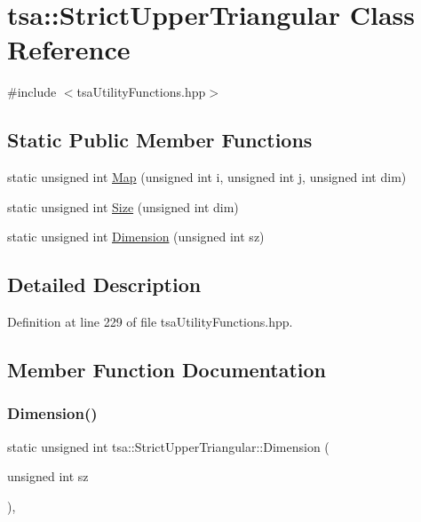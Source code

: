 \hypertarget{classtsa_1_1_strict_upper_triangular}{}\section{tsa\+:\+:Strict\+Upper\+Triangular Class Reference}
\label{classtsa_1_1_strict_upper_triangular}


{\ttfamily \#include $<$tsa\+Utility\+Functions.\+hpp$>$}

\subsection*{Static Public Member Functions}
\begin{DoxyCompactItemize}
\item 
static unsigned int \hyperlink{classtsa_1_1_strict_upper_triangular_a181559cdcde4660621e9c4d593cdb91b}{Map} (unsigned int i, unsigned int j, unsigned int dim)
\item 
static unsigned int \hyperlink{classtsa_1_1_strict_upper_triangular_a07caedb4fa38d3e286e392633c7c8d51}{Size} (unsigned int dim)
\item 
static unsigned int \hyperlink{classtsa_1_1_strict_upper_triangular_adc6c120ca12440c7679a0323f88f1c9c}{Dimension} (unsigned int sz)
\end{DoxyCompactItemize}


\subsection{Detailed Description}


Definition at line 229 of file tsa\+Utility\+Functions.\+hpp.



\subsection{Member Function Documentation}
\mbox{\label{classtsa_1_1_strict_upper_triangular_adc6c120ca12440c7679a0323f88f1c9c}} 
\subsubsection{\texorpdfstring{Dimension()}{Dimension()}}
{\footnotesize\ttfamily static unsigned int tsa\+::\+Strict\+Upper\+Triangular\+::\+Dimension (\begin{DoxyParamCaption}\item[{unsigned int}]{sz }\end{DoxyParamCaption})\hspace{0.3cm}{\ttfamily [inline]}, {\ttfamily [static]}}



